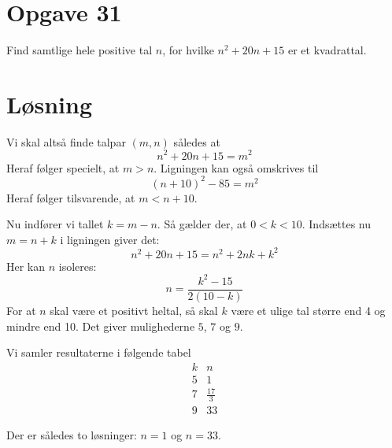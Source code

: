 \documentclass[12pt,oneside,a4paper]{article}
\begin{document}
\section{Opgave 31}
Find samtlige hele positive tal $n$, for hvilke $n^2+20n+15$ er et kvadrattal.

\section{Løsning}
Vi skal altså finde talpar $(m,n)$ således at 
$$
n^2+20n+15 = m^2
$$
Heraf følger specielt, at $m>n$.
Ligningen kan også omskrives til
$$
(n+10)^2-85 = m^2
$$
Heraf følger tilsvarende, at $m<n+10$.

Nu indfører vi tallet $k = m-n$. Så gælder der, at $0 < k < 10$. Indsættes nu $m=n+k$ i ligningen giver det:
$$
n^2+20n+15 = n^2+2nk + k^2
$$
Her kan $n$ isoleres:
$$
n = \frac{k^2-15}{2(10-k)}
$$
For at $n$ skal være et positivt heltal, så skal $k$ være et ulige tal større end 4 og mindre end 10. Det giver mulighederne $5$, $7$ og $9$.

Vi samler resultaterne i følgende tabel
$$
\begin{array}{cc}
    k & n \\
    \hline
    5 & 1 \\
    7 & \frac{17}{3} \\
    9 & 33
\end{array}
$$

Der er således to løsninger: $n=1$ og $n=33$.
\end{document}
